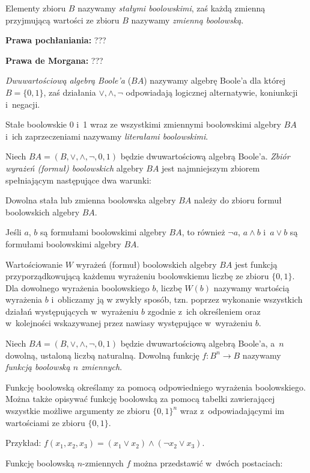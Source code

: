 \documentclass[a4paper,11pt,twoside]{article}
\theoremstyle{definition}
\begin{document}
Elementy zbioru $B$ nazywamy {\em stałymi boolowskimi}, zaś każdą zmienną przyjmującą wartości ze zbioru $B$ nazywamy {\em zmienną boolowską}.

{\bf Prawa pochłaniania:} ???

{\bf Prawa de Morgana:} ???

{\em Dwuwartościową algebrą Boole'a} ($\mathit{BA}$) nazywamy algebrę Boole'a dla której $B=\{0,1\}$, zaś działania $\vee,\wedge,\neg$ odpowiadają logicznej alternatywie, koniunkcji i~negacji.

Stałe boolowskie 0 i~1 wraz ze wszystkimi zmiennymi boolowskimi algebry $\mathit{BA}$ i~ich zaprzeczeniami nazywamy {\em literałami boolowskimi}.

Niech $\mathit{BA} = (B,\vee,\wedge,\neg,0,1)$ będzie dwuwartościową algebrą Boole'a. {\em Zbiór wyrażeń (formuł) boolowskich}  algebry $\mathit{BA}$ jest najmniejszym zbiorem spełniającym następujące dwa warunki:

Dowolna stała lub zmienna boolowska algebry $\mathit{BA}$ należy do zbioru formuł boolowskich algebry $\mathit{BA}$.

Jeśli $a$, $b$ są formułami boolowskimi algebry $\mathit{BA}$, to również $\neg a$, $a \wedge b$ i~$a \vee b$ są formułami boolowskimi algebry $\mathit{BA}$.

Wartościowanie $W$ wyrażeń (formuł) boolowskich algebry $\mathit{BA}$ jest funkcją przyporządkowującą każdemu wyrażeniu boolowskiemu liczbę ze zbioru $\{0,1\}$. Dla dowolnego wyrażenia boolowskiego $b$, liczbę $W(b)$ nazywamy wartością wyrażenia $b$ i~obliczamy ją w zwykły sposób, tzn. poprzez wykonanie wszystkich działań występujących w~wyrażeniu $b$ zgodnie z~ich określeniem oraz w~kolejności wskazywanej przez nawiasy występujące w~wyrażeniu $b$.

Niech $\mathit{BA} = (B,\vee,\wedge,\neg,0,1)$ będzie dwuwartościową algebrą Boole'a, a~$n$ dowolną, ustaloną liczbą naturalną. Dowolną funkcję $f\colon B^n \to B$ nazywamy {\em funkcją boolowską $n$ zmiennych}.

Funkcję boolowską określamy za pomocą odpowiedniego wyrażenia boolowskiego. Można także opisywać funkcję boolowską za pomocą tabelki zawierającej wszystkie możliwe argumenty ze zbioru $\{0,1\}^n$ wraz z~odpowiadającymi im wartościami ze zbioru $\{0,1\}$.

Przykład: $f(x_1,x_2,x_3) = (x_1 \vee x_2) \wedge (\neg x_2 \vee x_3)$.

Funkcję boolowską $n$-zmiennych $f$ można przedstawić w~dwóch postaciach:
\end{document}
